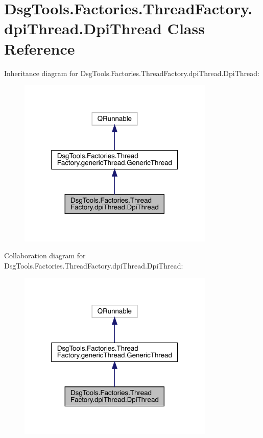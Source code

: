 \hypertarget{class_dsg_tools_1_1_factories_1_1_thread_factory_1_1dpi_thread_1_1_dpi_thread}{}\section{Dsg\+Tools.\+Factories.\+Thread\+Factory.\+dpi\+Thread.\+Dpi\+Thread Class Reference}
\label{class_dsg_tools_1_1_factories_1_1_thread_factory_1_1dpi_thread_1_1_dpi_thread}


Inheritance diagram for Dsg\+Tools.\+Factories.\+Thread\+Factory.\+dpi\+Thread.\+Dpi\+Thread\+:
\nopagebreak
\begin{figure}[H]
\begin{center}
\leavevmode
\includegraphics[width=265pt]{class_dsg_tools_1_1_factories_1_1_thread_factory_1_1dpi_thread_1_1_dpi_thread__inherit__graph}
\end{center}
\end{figure}


Collaboration diagram for Dsg\+Tools.\+Factories.\+Thread\+Factory.\+dpi\+Thread.\+Dpi\+Thread\+:
\nopagebreak
\begin{figure}[H]
\begin{center}
\leavevmode
\includegraphics[width=265pt]{class_dsg_tools_1_1_factories_1_1_thread_factory_1_1dpi_thread_1_1_dpi_thread__coll__graph}
\end{center}
\end{figure}
